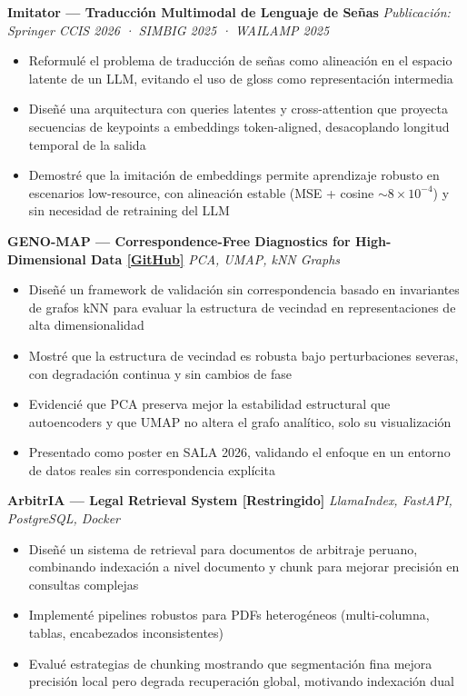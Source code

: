 \textbf{Imitator --- Traducción Multimodal de Lenguaje de Señas} \hfill \textit{Publicación: Springer CCIS 2026 · SIMBIG 2025 · WAILAMP 2025}
\begin{itemize}[leftmargin=1.2em, itemsep=1pt, topsep=2pt]
\item Reformulé el problema de traducción de señas como alineación en el espacio latente de un LLM, evitando el uso de gloss como representación intermedia
\item Diseñé una arquitectura con queries latentes y cross-attention que proyecta secuencias de keypoints a embeddings token-aligned, desacoplando longitud temporal de la salida
\item Demostré que la imitación de embeddings permite aprendizaje robusto en escenarios low-resource, con alineación estable (MSE + cosine $\sim 8\times10^{-4}$) y sin necesidad de retraining del LLM
\end{itemize}
\vspace{2pt}

\textbf{GENO-MAP --- Correspondence-Free Diagnostics for High-Dimensional Data \enspace\href{\detokenize{https://github.com/R0SEWT/GENO-MAP_Correspondence-Free-Diagnostics-for-Sweet-Potato-Diversity-Maps}}{[GitHub]}} \hfill \textit{PCA, UMAP, kNN Graphs}
\begin{itemize}[leftmargin=1.2em, itemsep=1pt, topsep=2pt]
\item Diseñé un framework de validación sin correspondencia basado en invariantes de grafos kNN para evaluar la estructura de vecindad en representaciones de alta dimensionalidad
\item Mostré que la estructura de vecindad es robusta bajo perturbaciones severas, con degradación continua y sin cambios de fase
\item Evidencié que PCA preserva mejor la estabilidad estructural que autoencoders y que UMAP no altera el grafo analítico, solo su visualización
\item Presentado como poster en SALA 2026, validando el enfoque en un entorno de datos reales sin correspondencia explícita
\end{itemize}
\vspace{2pt}

\textbf{ArbitrIA --- Legal Retrieval System {[Restringido]}} \hfill \textit{LlamaIndex, FastAPI, PostgreSQL, Docker}
\begin{itemize}[leftmargin=1.2em, itemsep=1pt, topsep=2pt]
  \item Diseñé un sistema de retrieval para documentos de arbitraje peruano, combinando indexación a nivel documento y chunk para mejorar precisión en consultas complejas
  \item Implementé pipelines robustos para PDFs heterogéneos (multi-columna, tablas, encabezados inconsistentes)
  \item Evalué estrategias de chunking mostrando que segmentación fina mejora precisión local pero degrada recuperación global, motivando indexación dual
\end{itemize}

